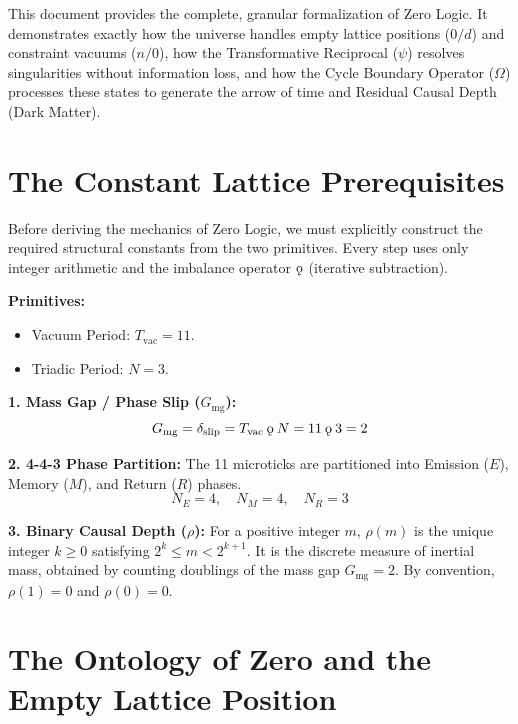 \documentclass[11pt, letterpaper]{article}
\newcommand{\koppa}{\mathbin{\text{\rm\k{o}}}}
\newcommand{\Tvac}{T_{\mathrm{vac}}}
\newcommand{\Gmg}{G_{\mathrm{mg}}}
\newcommand{\dslip}{\delta_{\mathrm{slip}}}
\newcommand{\psiop}{\psi}
\newcommand{\rank}{\rho}
\begin{document}
This document provides the complete, granular formalization of Zero Logic. It demonstrates exactly how the universe handles empty lattice positions ($0/d$) and constraint vacuums ($n/0$), how the Transformative Reciprocal ($\psiop$) resolves singularities without information loss, and how the Cycle Boundary Operator ($\Omega$) processes these states to generate the arrow of time and Residual Causal Depth (Dark Matter).

\section{The Constant Lattice Prerequisites}

Before deriving the mechanics of Zero Logic, we must explicitly construct the required structural constants from the two primitives. Every step uses only integer arithmetic and the imbalance operator $\koppa$ (iterative subtraction).

\begin{rsbox}
\textbf{Primitives:}
\begin{itemize}
    \item Vacuum Period: $\Tvac = 11$.
    \item Triadic Period: $N = 3$.
\end{itemize}

\textbf{1. Mass Gap / Phase Slip ($\Gmg$):}
\[ \Gmg = \dslip = \Tvac \koppa N = 11 \koppa 3 = 2 \]

\textbf{2. 4-4-3 Phase Partition:}
The 11 microticks are partitioned into Emission ($E$), Memory ($M$), and Return ($R$) phases.
\[ N_E = 4, \quad N_M = 4, \quad N_R = 3 \]

\textbf{3. Binary Causal Depth ($\rank$):}
For a positive integer $m$, $\rank(m)$ is the unique integer $k \ge 0$ satisfying $2^k \le m < 2^{k+1}$. It is the discrete measure of inertial mass, obtained by counting doublings of the mass gap $\Gmg = 2$. By convention, $\rank(1) = 0$ and $\rank(0) = 0$.
\end{rsbox}

\section{The Ontology of Zero and the Empty Lattice Position}
\end{document}
